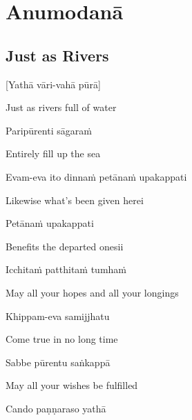 
\chapter{Anumodanā}

\setsecheadstyle{\subsectionFmt}
\section{Just as Rivers}
\label{just-as-rivers}

[Yathā vāri-vahā pūrā]

\begin{english}
  Just as rivers full of water
\end{english}

Paripūrenti sāgaraṁ

\begin{english}
  Entirely fill up the sea
\end{english}

Evam-eva ito dinnaṁ petānaṁ upakappati

\begin{english}
  Likewise what's been given herei
\end{english}


Petānaṁ upakappati

\begin{english}
  Benefits the departed onesii
\end{english}


Icchitaṁ patthitaṁ tumhaṁ

\begin{english}
  May all your hopes and all your longings
\end{english}

Khippam-eva samijjhatu

\begin{english}
  Come true in no long time
\end{english}

Sabbe pūrentu saṅkappā

\begin{english}
  May all your wishes be fulfilled
\end{english}

Cando paṇṇaraso yathā

